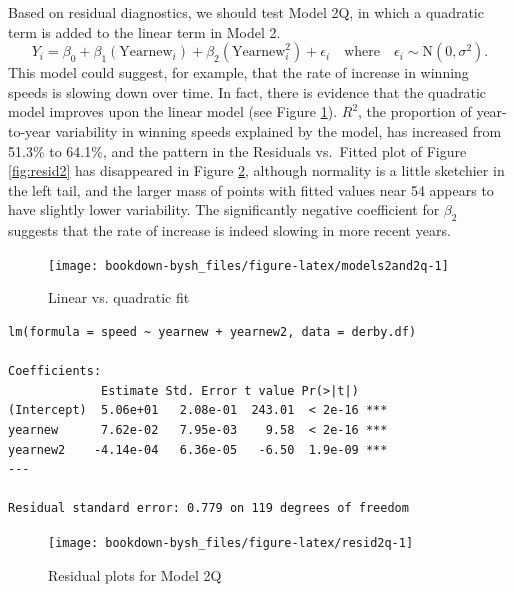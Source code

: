 \documentclass[
]{krantz}
\begin{document}
Based on residual diagnostics, we should test Model 2Q, in which a quadratic term is added to the linear term in Model 2.\\
\begin{equation}
Y_{i}=\beta_{0}+\beta_{1}(\textrm{Yearnew}_{i})+\beta_{2}(\textrm{Yearnew}^2_{i})+\epsilon_{i}\quad \textrm{where}\quad \epsilon_{i}\sim \textrm{N}(0,\sigma^2).
\label{eq:model2Q}
\end{equation}
This model could suggest, for example, that the rate of increase in winning speeds is slowing down over time. In fact, there is evidence that the quadratic model improves upon the linear model (see Figure \ref{fig:models2and2q}). \(R^2\), the proportion of year-to-year variability in winning speeds explained by the model, has increased from 51.3\% to 64.1\%, and the pattern in the Residuals vs.~Fitted plot of Figure \ref{fig:resid2} has disappeared in Figure \ref{fig:resid2q}, although normality is a little sketchier in the left tail, and the larger mass of points with fitted values near 54 appears to have slightly lower variability. The significantly negative coefficient for \(\beta_{2}\) suggests that the rate of increase is indeed slowing in more recent years.

\begin{figure}

{\centering \texttt{[image: bookdown-bysh\_files/figure-latex/models2and2q-1]} 

}

\caption{Linear vs. quadratic fit}\label{fig:models2and2q}
\end{figure}

\begin{verbatim}
lm(formula = speed ~ yearnew + yearnew2, data = derby.df)

Coefficients:
             Estimate Std. Error t value Pr(>|t|)    
(Intercept)  5.06e+01   2.08e-01  243.01  < 2e-16 ***
yearnew      7.62e-02   7.95e-03    9.58  < 2e-16 ***
yearnew2    -4.14e-04   6.36e-05   -6.50  1.9e-09 ***
---

Residual standard error: 0.779 on 119 degrees of freedom
\end{verbatim}

\begin{figure}

{\centering \texttt{[image: bookdown-bysh\_files/figure-latex/resid2q-1]} 

}

\caption{Residual plots for Model 2Q}\label{fig:resid2q}
\end{figure}
\end{document}
